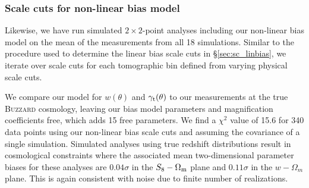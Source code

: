 \documentclass[aps, prd,twocolumn,superscriptaddress,nofootinbib,preprintnumbers]{revtex4-1}
\newcommand{\gammat}{\ensuremath{\gamma_{\rm t}(\theta)}}
\newcommand{\wtheta}{\ensuremath{w(\theta)}}
\begin{document}
\subsubsection{Scale cuts for non-linear bias model}
Likewise, we have run simulated $2\times 2$-point analyses including our non-linear bias model on the mean of the measurements from all 18 simulations. Similar to the procedure used to determine the linear bias scale cuts in \S\ref{sec:sc_linbias}, we iterate over scale cuts for each tomographic bin defined from varying physical scale cuts. 

We compare our model for $w(\theta)$ and $\gamma_{\rm t}(\theta)$ to our measurements at the true \textsc{Buzzard} cosmology, leaving our bias model parameters and magnification coefficients free, which adds 15 free parameters. We find a $\chi^2$ value of 15.6 for 340 data points using our non-linear bias scale cuts and assuming the covariance of a single simulation. Simulated analyses using true redshift distributions result in cosmological constraints where the associated mean two-dimensional parameter biases for these analyses are $0.04\sigma$ in the $S_8-\Omega_{\rm m}$ plane and $0.11\sigma$ in the $w-\Omega_{m}$ plane. This is again consistent with noise due to finite number of realizations. 

\end{document}
